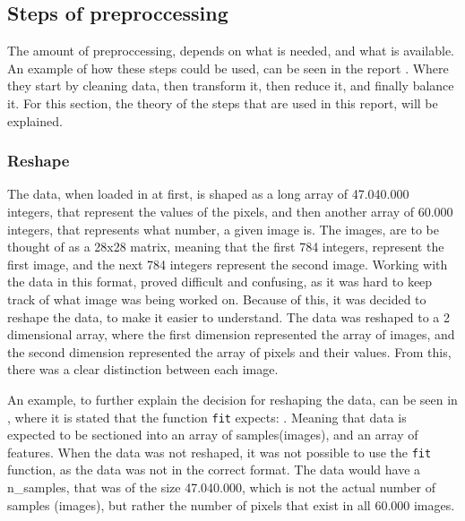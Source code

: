 \subsection{Steps of preproccessing}
The amount of preproccessing, depends on what is needed, and what is available. An example of how these steps could be used, can be seen in the report \cite{Data-preprocessing-for-flight-delays}. Where they start by cleaning data, then transform it, then reduce it, and finally balance it. For this section, the theory of the steps that are used in this report, will be explained.

\subsubsection{Reshape}
The data, when loaded in at first, is shaped as a long array of 47.040.000 integers, that represent the values of the pixels, and then another array of 60.000 integers, that represents what number, a given image is. The images, are to be thought of as a 28x28 matrix, meaning that the first 784 integers, represent the first image, and the next 784 integers represent the second image. Working with the data in this format, proved difficult and confusing, as it was hard to keep track of what image was being worked on. Because of this, it was decided to reshape the data, to make it easier to understand. The data was reshaped to a 2 dimensional array, where the first dimension represented the array of images, and the second dimension represented the array of pixels and their values. From this, there was a clear distinction between each image.

An example, to further explain the decision for reshaping the data, can be seen in \cite{scikit-learn-PCA}, where it is stated that the function \texttt{fit} expects: . Meaning that data is expected to be sectioned into an array of samples(images), and an array of features. When the data was not reshaped, it was not possible to use the \texttt{fit} function, as the data was not in the correct format. The data would have a n\_samples, that was of the size 47.040.000, which is not the actual number of samples (images), but rather the number of pixels that exist in all 60.000 images.





